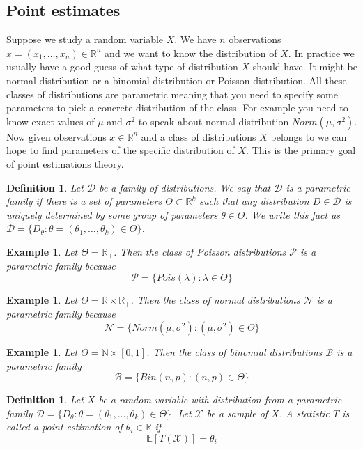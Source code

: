 \documentclass[12pt]{article}
\newtheorem{definition}[theorem]{Definition}
\newtheorem{example}[theorem]{Example}
\begin{document}
\subsection{Point estimates}

Suppose we study a random variable $X$. We have $n$ observations $x=(x_1,\ldots,x_n)\in\mathbb{R}^n$ and we want to know the distribution of $X$. In practice we usually have a good guess of what type of distribution $X$ should have. It might be normal distribution or a binomial distribution or Poisson distribution. All these classes of distributions are parametric meaning that you need to specify some parameters to pick a concrete distribution of the class. For example you need to know exact values of $\mu$ and $\sigma^2$ to speak about normal distribution $Norm(\mu,\sigma^2)$. Now given observations $x\in\mathbb{R}^n$ and a class of distributions $X$ belongs to we can hope to find parameters of the specific distribution of $X$. This is the primary goal of point estimations theory. 

\begin{definition} Let $\mathcal{D}$ be a family of distributions. We say that $\mathcal{D}$ is a parametric family if there is a set of parameters $\Theta\subset\mathbb{R}^k$ such that any distribution $D\in\mathcal{D}$ is uniquely determined by some group of parameters $\theta\in\Theta$. We write this fact as $\mathcal{D}=\{D_\theta:\theta=(\theta_1,\ldots,\theta_k)\in\Theta\}$.  
\end{definition}

\begin{example} Let $\Theta=\mathbb{R}_+$. Then the class of Poisson distributions $\mathcal{P}$ is a parametric family because
$$
\mathcal{P}=\{Pois(\lambda):\lambda\in\Theta\}
$$
\end{example}

\begin{example} Let $\Theta=\mathbb{R}\times\mathbb{R}_+$. Then the class of normal distributions $\mathcal{N}$ is a parametric family because 
$$
\mathcal{N}=\{Norm(\mu,\sigma^2): (\mu,\sigma^2)\in\Theta\}
$$ 
\end{example}

\begin{example} Let $\Theta=\mathbb{N}\times[0,1]$. Then the class of binomial distributions $\mathcal{B}$ is a parametric family
$$
\mathcal{B}=\{Bin(n,p):(n,p)\in\Theta\}
$$
\end{example}

\begin{definition} Let $X$ be a random variable with distribution from a parametric family $\mathcal{D}=\{D_\theta:\theta=(\theta_1,\ldots,\theta_k)\in\Theta\}$. Let $\mathscr{X}$ be a sample of $X$. A statistic $T$ is called a point estimation of $\theta_i\in\mathbb{R}$ if
$$
\mathbb{E}[T(\mathscr{X})]=\theta_i
$$
\end{definition}
\end{document}
